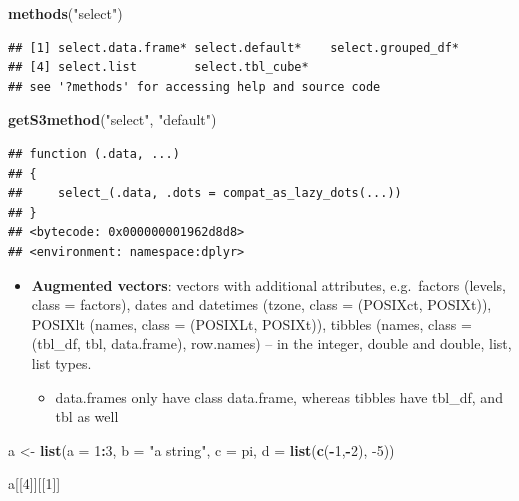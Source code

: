 \documentclass[]{book}
\newenvironment{Shaded}{\begin{snugshade}}{\end{snugshade}}
\newcommand{\DataTypeTok}[1]{\textcolor[rgb]{0.13,0.29,0.53}{#1}}
\newcommand{\DecValTok}[1]{\textcolor[rgb]{0.00,0.00,0.81}{#1}}
\newcommand{\KeywordTok}[1]{\textcolor[rgb]{0.13,0.29,0.53}{\textbf{#1}}}
\newcommand{\NormalTok}[1]{#1}
\newcommand{\OperatorTok}[1]{\textcolor[rgb]{0.81,0.36,0.00}{\textbf{#1}}}
\newcommand{\StringTok}[1]{\textcolor[rgb]{0.31,0.60,0.02}{#1}}
\providecommand{\tightlist}{%
  \setlength{\itemsep}{0pt}\setlength{\parskip}{0pt}}
\theoremstyle{definition}
\theoremstyle{definition}
\theoremstyle{definition}
\theoremstyle{remark}
\begin{document}
\begin{Shaded}
\begin{Highlighting}[]
\KeywordTok{methods}\NormalTok{(}\StringTok{"select"}\NormalTok{)}
\end{Highlighting}
\end{Shaded}

\begin{verbatim}
## [1] select.data.frame* select.default*    select.grouped_df*
## [4] select.list        select.tbl_cube*  
## see '?methods' for accessing help and source code
\end{verbatim}

\begin{Shaded}
\begin{Highlighting}[]
\KeywordTok{getS3method}\NormalTok{(}\StringTok{"select"}\NormalTok{, }\StringTok{"default"}\NormalTok{)}
\end{Highlighting}
\end{Shaded}

\begin{verbatim}
## function (.data, ...) 
## {
##     select_(.data, .dots = compat_as_lazy_dots(...))
## }
## <bytecode: 0x000000001962d8d8>
## <environment: namespace:dplyr>
\end{verbatim}

\begin{itemize}
\tightlist
\item
  \textbf{Augmented vectors}: vectors with additional attributes,
  e.g.~factors (levels, class = factors), dates and datetimes (tzone,
  class = (POSIXct, POSIXt)), POSIXlt (names, class = (POSIXLt,
  POSIXt)), tibbles (names, class = (tbl\_df, tbl, data.frame),
  row.names) -- in the integer, double and double, list, list types.

  \begin{itemize}
  \tightlist
  \item
    data.frames only have class data.frame, whereas tibbles have
    tbl\_df, and tbl as well
  \end{itemize}
\end{itemize}

\begin{Shaded}
\begin{Highlighting}[]
\NormalTok{a <-}\StringTok{ }\KeywordTok{list}\NormalTok{(}\DataTypeTok{a =} \DecValTok{1}\OperatorTok{:}\DecValTok{3}\NormalTok{, }\DataTypeTok{b =} \StringTok{"a string"}\NormalTok{, }\DataTypeTok{c =}\NormalTok{ pi, }\DataTypeTok{d =} \KeywordTok{list}\NormalTok{(}\KeywordTok{c}\NormalTok{(}\OperatorTok{-}\DecValTok{1}\NormalTok{,}\OperatorTok{-}\DecValTok{2}\NormalTok{), }\DecValTok{-5}\NormalTok{))}

\NormalTok{a[[}\DecValTok{4}\NormalTok{]][[}\DecValTok{1}\NormalTok{]]}
\end{Highlighting}
\end{Shaded}
\end{document}
